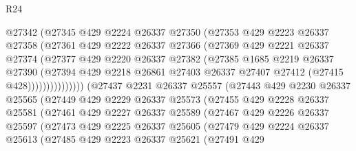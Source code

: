 \begin{lexlean}{R24}
\begin{coremodule}
                      @27342
                      (@27345
                        @429
                        @2224
                        @26337
                        @27350
                        (@27353
                          @429
                          @2223
                          @26337
                          @27358
                          (@27361
                            @429
                            @2222
                            @26337
                            @27366
                            (@27369
                              @429
                              @2221
                              @26337
                              @27374
                              (@27377
                                @429
                                @2220
                                @26337
                                @27382
                                (@27385
                                  @1685
                                  @2219
                                  @26337
                                  @27390
                                  (@27394
                                    @429
                                    @2218
                                    @26861
                                    @27403
                                    @26337
                                    @27407
                                    @27412
                                    (@27415 @428)))))))))))))))
        (@27437
          @2231
          @26337
          @25557
          (@27443
            @429
            @2230
            @26337
            @25565
            (@27449
              @429
              @2229
              @26337
              @25573
              (@27455
                @429
                @2228
                @26337
                @25581
                (@27461
                  @429
                  @2227
                  @26337
                  @25589
                  (@27467
                    @429
                    @2226
                    @26337
                    @25597
                    (@27473
                      @429
                      @2225
                      @26337
                      @25605
                      (@27479
                        @429
                        @2224
                        @26337
                        @25613
                        (@27485
                          @429
                          @2223
                          @26337
                          @25621
                          (@27491
                            @429

\end{coremodule}
\end{lexlean}

